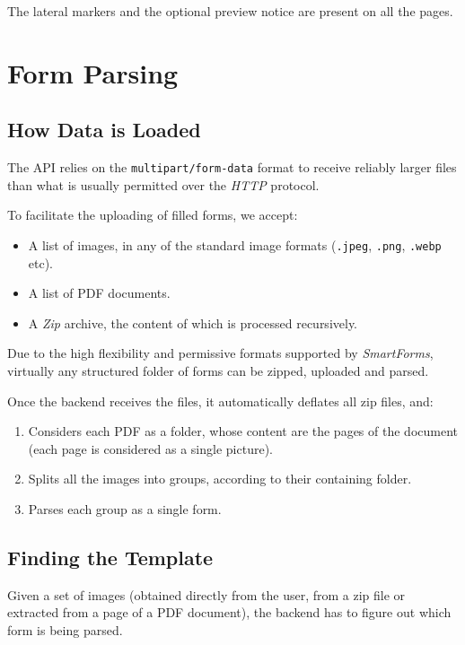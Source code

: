 \documentclass[11pt, a4paper]{report}
\def\code#1{\texttt{#1}}
\begin{document}
The lateral markers and the optional preview notice are present on all the pages.



\chapter{Form Parsing}

\section{How Data is Loaded}

The API relies on the \code{multipart/form-data}\cite{masinter1998rfc2388} format to receive reliably larger files than what is usually permitted over the \textit{HTTP} protocol.

To facilitate the uploading of filled forms, we accept:
\begin{itemize}
    \item A list of images, in any of the standard image formats (\code{.jpeg}, \code{.png}, \code{.webp} etc).
    \item A list of PDF documents.
    \item A \textit{Zip} archive, the content of which is processed recursively.
\end{itemize}

Due to the high flexibility and permissive formats supported by \textit{SmartForms}, virtually any structured folder of forms can be zipped, uploaded and parsed.

Once the backend receives the files, it automatically deflates all zip files, and:
\begin{enumerate}
    \item Considers each PDF as a folder, whose content are the pages of the document (each page is considered as a single picture).
    \item Splits all the images into groups, according to their containing folder.
    \item Parses each group as a single form.
\end{enumerate}

\section{Finding the Template}

Given a set of images (obtained directly from the user, from a zip file or extracted from a page of a PDF document), the backend has to figure out which form is being parsed.
\end{document}
